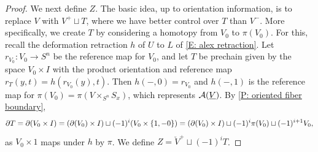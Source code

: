 \begin{proof}

	We next define $Z$. The basic idea, up to orientation information, is to replace $V$ with $V^+ \sqcup T$, where we have better control over $T$ than $V^-$.
	More specifically, we create $T$ by considering a homotopy from $V_0$ to $\pi(V_0)$.
	For this, recall the deformation retraction $h$ of $U$ to $L$ of \eqref{E: alex retraction}.
	Let $r_{V_0} \colon V_0 \to S^n$ be the reference map for $V_0$, and let $T$ be prechain given by the space $V_0 \times I$ with the product orientation and reference map $r_T(y,t) = h(r_{V_0}(y),t)$.
	Then $h(-,0) = r_{V_0}$ and $h(-,1)$ is the reference map for $\pi(V_0) = \pi(V \times_{S^n} S_x)$, which represents $\mathcal{A}(\underline{V})$.
	By \cref{P: oriented fiber boundary},
	\begin{equation}\label{E: alex cylinder bdry}
		\partial T = \partial (V_0 \times I) = (\partial (V_0) \times I) \sqcup (-1)^{i} (V_0 \times \{1,-0\}) = (\partial (V_0) \times I) \sqcup (-1)^i\pi(V_0)\sqcup (-1)^{i+1} V_0,
	\end{equation}
	as $V_0 \times 1$ maps under $h$ by $\pi$.
	We define $Z = \check V^+ \sqcup (-1)^i T$.

\end{proof}

